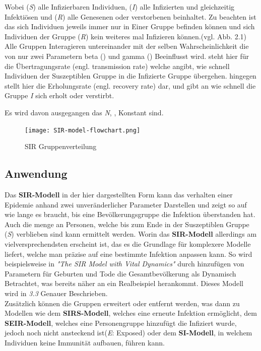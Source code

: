 \documentclass[12pt]{scrartcl} %
\begin{document}
Wobei (\textit{S}) alle Infizierbaren Individuen, (\textit{I}) alle Infizierten und gleichzeitig Infektiösen und (\textit{R}) alle Genesenen oder verstorbenen beinhaltet.  Zu beachten ist das sich Individuen jeweils immer nur in Einer Gruppe befinden können und sich Individuen der Gruppe 
(\textit{R}) kein weiteres mal Infizieren können.(vgl. Abb. 2.1) \cite[vgl.]{4}
Alle Gruppen Interagieren untereinander mit der selben Wahrscheinlichkeit die von nur zwei Parametern beta (\textbeta) und gamma (\textgamma) Beeinflusst wird. 
\textbeta \space steht hier für die Übertragungsrate (engl. transmission rate) welche angibt, wie schnell Individuen der Suszeptiblen Gruppe in die Infizierte Gruppe übergehen. 
\textgamma \space hingegen stellt hier die Erholungsrate (engl. recovery rate) dar, und gibt an wie schnell die Gruppe \textit{I} sich erholt oder verstirbt.

Es wird davon ausgegangen das \textit{N}, \textbeta, \textgamma \space Konstant sind.

	\begin{figure}[h]
	\centering
	\texttt{[image: SIR-model-flowchart.png]} 
	\caption{SIR Gruppenverteilung}
	\end{figure}


\subsection{Anwendung}

Das \textbf{SIR-Modell} in der hier dargestellten Form kann das verhalten einer Epidemie anhand zwei unveränderlicher Parameter Darstellen und zeigt so auf wie lange es braucht, bis eine Bevölkerungsgruppe die Infektion überstanden hat. Auch die menge an Personen, welche bis zum Ende in der Suszeptiblen Gruppe (\textit{S}) verblieben sind kann ermittelt werden. 
Worin das \textbf{SIR-Modell} allerdings am vielversprechendsten erscheint ist, das es die Grundlage für komplexere Modelle liefert, welche man präzise auf eine bestimmte Infektion anpassen kann.
So wird beispielsweise in \textsl{"The SIR Model with Vital Dynamics"} \cite[s. 132]{5} durch hinzufügen von Parametern für Geburten und Tode die Gesamtbevölkerung als Dynamisch Betrachtet, was bereits näher an ein Realbeispiel herankommt.
Dieses Modell wird in \textsl{3.3} Genauer Beschrieben.\\
Zusätzlich können die Gruppen erweitert oder entfernt werden, was dann zu Modellen wie dem 
\textbf{SIRS-Modell}, welches eine erneute Infektion ermöglicht, dem \textbf{SEIR-Modell}, welches eine Personengruppe hinzufügt die Infiziert wurde, jedoch noch nicht ansteckend ist(\textit{E}: Exposed) oder dem \textbf{SI-Modell}, in welchem Individuen keine Immunität aufbauen, führen kann.
\end{document}

